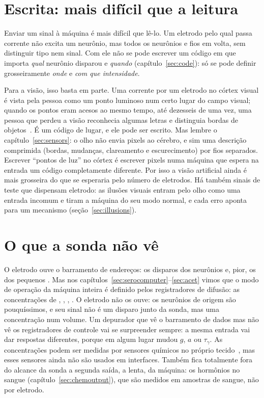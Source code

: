 \section{Escrita: mais difícil que a leitura}

Enviar um sinal à máquina é mais difícil que lê-lo. Um eletrodo pelo qual passa corrente não excita um neurônio, mas todos os neurônios e fios em volta, sem distinguir tipo nem sinal. Com ele não se pode escrever um código em que importa \emph{qual} neurônio disparou e \emph{quando} (capítulo~\ref{sec:code}): só se pode definir grosseiramente \emph{onde} e \emph{com que intensidade}.

Para a visão, isso basta em parte. Uma corrente por um eletrodo no córtex visual é vista pela pessoa como um ponto luminoso num certo lugar do campo visual; quando os pontos eram acesos ao mesmo tempo, até dezesseis de uma vez, uma pessoa que perdeu a visão reconhecia algumas letras e distinguia bordas de objetos~\cite{Fernandez2021}. É um código de lugar, e ele pode ser escrito. Mas lembre o capítulo~\ref{sec:sensors}: o olho não envia pixels ao cérebro, e sim uma descrição comprimida (bordas, mudanças, clareamento e escurecimento) por fios separados. Escrever ``pontos de luz'' no córtex é escrever pixels numa máquina que espera na entrada um código completamente diferente. Por isso a visão artificial ainda é mais grosseira do que se esperaria pelo número de eletrodos. Há também sinais de teste que dispensam eletrodo: as ilusões visuais entram pelo olho como uma entrada incomum e tiram a máquina do seu modo normal, e cada erro aponta para um mecanismo (seção~\ref{sec:illusions}).

\section{O que a sonda não vê}

O eletrodo ouve o barramento de endereços: os disparos dos neurônios  e, pior, os dos pequenos . Mas nos capítulos~\ref{sec:serocomputer}--\ref{sec:acet} vimos que o modo de operação da máquina inteira é definido pelos registradores de difusão: as concentrações de , , , . O eletrodo não os ouve: os neurônios de origem são pouquíssimos, e seu sinal não é um disparo junto da sonda, mas uma concentração num volume. Um depurador que vê o barramento de dados mas não vê os registradores de controle vai se surpreender sempre: a mesma entrada vai dar respostas diferentes, porque em algum lugar mudou $g$, $a$ ou $\tau_\gamma$. As concentrações podem ser medidas por sensores químicos no próprio tecido~\cite{Bunin1998}, mas esses sensores ainda não são usados em interfaces. Também fica totalmente fora do alcance da sonda a segunda saída, a lenta, da máquina: os hormônios no sangue (capítulo~\ref{sec:chemoutput}), que são medidos em amostras de sangue, não por eletrodo.


